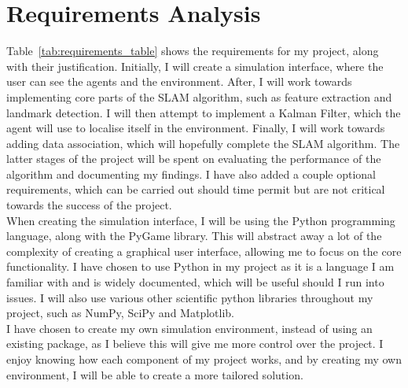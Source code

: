 \documentclass[12pt]{article}
\begin{document}
\section{Requirements Analysis}
Table~\ref{tab:requirements_table} shows the requirements for my project, along with their justification. Initially, I will
create a simulation interface, where the user can see the agents and the environment. After, I will work towards implementing
core parts of the SLAM algorithm, such as feature extraction and landmark detection. I will then attempt to implement a Kalman
Filter, which the agent will use to localise itself in the environment. Finally, I will work towards adding data association, which will
hopefully complete the SLAM algorithm. The latter stages of the project will be spent on evaluating the performance of the algorithm
and documenting my findings. I have also added a couple optional requirements, which can be carried out should time permit but are
not critical towards the success of the project.\\
When creating the simulation interface, I will be using the Python programming language, along with the PyGame library. This
will abstract away a lot of the complexity of creating a graphical user interface, allowing me to focus on the core functionality.
I have chosen to use Python in my project as it is a language I am familiar with and is widely documented, which will be useful
should I run into issues. I will also use various other scientific python libraries throughout my project, such as NumPy, SciPy and
Matplotlib.\\
 I have chosen to create my own simulation environment, instead of using an existing package, as I believe this will give me more
control over the project. I enjoy knowing how each component of my project works, and by creating my own environment, I will be able
to create a more tailored solution.\\
\end{document}
